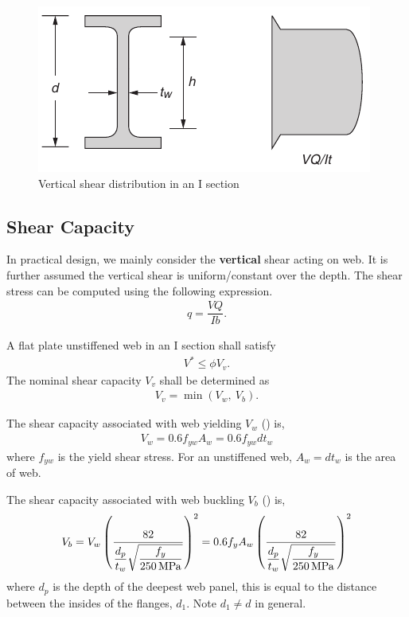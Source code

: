 \begin{figure}[H]
\centering\footnotesize
\includegraphics{PIC/CH05/VSHEAR}
\caption{Vertical shear distribution in an I section}\label{fig:vshear}
\end{figure}
\subsection{Shear Capacity}
In practical design, we mainly consider the \textbf{vertical} shear acting on web. It is further assumed the vertical shear is uniform/constant over the depth. The shear stress can be computed using the following expression.
\begin{gather*}
q=\dfrac{VQ}{Ib}.
\end{gather*}

A flat plate unstiffened web in an I section shall satisfy
\begin{gather}
V^*\leqslant\phi{}V_v.
\end{gather}
The nominal shear capacity $V_v$ shall be determined as
\begin{gather}
V_v=\min\left(V_w,~V_b\right).
\end{gather}

The shear capacity associated with web yielding $V_w$ () is,
\begin{gather}
V_w=0.6f_{yw}A_w=0.6f_{yw}dt_w
\end{gather}
where $f_{yw}$ is the yield shear stress. For an unstiffened web, $A_w=dt_w$ is the area of web.

The shear capacity associated with web buckling $V_b$ () is,
\begin{gather}
V_b=V_w\left(\dfrac{82}{\dfrac{d_p}{t_w}\sqrt{\dfrac{f_y}{\SI{250}{\mega\pascal}}}}\right)^2=0.6f_yA_w\left(\dfrac{82}{\dfrac{d_p}{t_w}\sqrt{\dfrac{f_y}{\SI{250}{\mega\pascal}}}}\right)^2
\end{gather}
where $d_p$ is the depth of the deepest web panel, this is equal to the distance between the insides of the flanges, $d_1$. Note $d_1\neq{}d$ in general.

